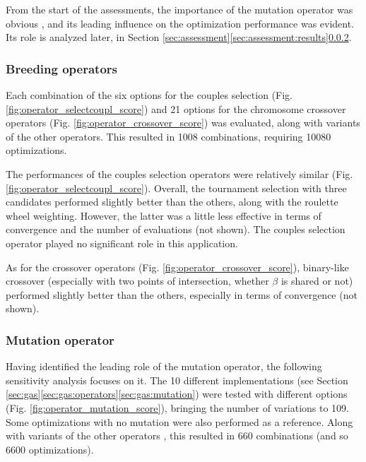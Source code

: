 \documentclass{ametsoc}
\begin{document}
From the start of the assessments, the importance of the mutation operator was obvious \cite[see][for details]{Horton2012a}, and its leading influence on the optimization performance was evident. Its role is analyzed later, in Section \ref{sec:assessment}\ref{sec:assessment:results}\ref{sec:assessment:mutation}.

\subsubsection{Breeding operators}

Each combination of the six options for the couples selection (Fig. \ref{fig:operator_selectcoupl_score}) and 21 options for the chromosome crossover operators (Fig. \ref{fig:operator_crossover_score}) was evaluated, along with variants of the other operators. This resulted in 1008 combinations, requiring 10080 optimizations.

The performances of the couples selection operators were relatively similar (Fig. \ref{fig:operator_selectcoupl_score}). Overall, the tournament selection with three candidates performed slightly better than the others, along with the roulette wheel weighting. However, the latter was a little less effective in terms of convergence and the number of evaluations (not shown). The couples selection operator played no significant role in this application. 

As for the crossover operators (Fig. \ref{fig:operator_crossover_score}), binary-like crossover (especially with two points of intersection, whether $\beta$ is shared or not) performed slightly better than the others, especially in terms of convergence (not shown).
	

\subsubsection{Mutation operator}
\label{sec:assessment:mutation}

Having identified the leading role of the mutation operator, the following sensitivity analysis focuses on it. The 10 different implementations (see Section \ref{sec:gas}\ref{sec:gas:operators}\ref{sec:gas:mutation}) were tested with different options (Fig. \ref{fig:operator_mutation_score}), bringing the number of variations to 109. Some optimizations with no mutation were also performed as a reference. Along with variants of the other operators \citep[see][for details]{Horton2012a}, this resulted in 660 combinations (and so 6600 optimizations).
\end{document}
